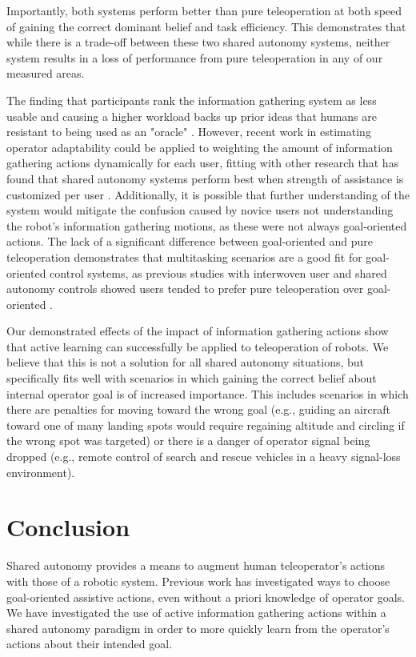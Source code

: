 \documentclass[conference]{IEEEtran}
\begin{document}
Importantly, both systems perform better than pure teleoperation at both speed of gaining the correct dominant belief and task efficiency. This demonstrates that while there is a trade-off between these two shared autonomy systems, neither system results in a loss of performance from pure teleoperation in any of our measured areas.

The finding that participants rank the information gathering system as less usable and causing a higher workload backs up prior ideas that humans are resistant to being used as an "oracle" \cite{javdani2015shared}. However, recent work in estimating operator adaptability \cite{nikolaidis2017human} could be applied to weighting the amount of information gathering actions dynamically for each user, fitting with other research that has found that shared autonomy systems perform best when strength of assistance is customized per user \cite{gopinath2017human}. Additionally, it is possible that further understanding of the system would mitigate the confusion caused by novice users not understanding the robot's information gathering motions, as these were not always goal-oriented actions. The lack of a significant difference between goal-oriented and pure teleoperation demonstrates that multitasking scenarios are a good fit for goal-oriented control systems, as previous studies with interwoven user and shared autonomy controls showed users tended to prefer pure teleoperation over goal-oriented \cite{javdani2018shared}.

Our demonstrated effects of the impact of information gathering actions show that active learning can successfully be applied to teleoperation of robots. We believe that this is not a solution for all shared autonomy situations, but specifically fits well with scenarios in which gaining the correct belief about internal operator goal is of increased importance. This includes scenarios in which there are penalties for moving toward the wrong goal (e.g., guiding an aircraft toward one of many landing spots would require regaining altitude and circling if the wrong spot was targeted) or there is a danger of operator signal being dropped (e.g., remote control of search and rescue vehicles in a heavy signal-loss environment).

\section{Conclusion}

Shared autonomy provides a means to augment human teleoperator's actions with those of a robotic system. Previous work has investigated ways to choose goal-oriented assistive actions, even without a priori knowledge of operator goals. We have investigated the use of active information gathering actions within a shared autonomy paradigm in order to more quickly learn from the operator's actions about their intended goal.
\end{document}
